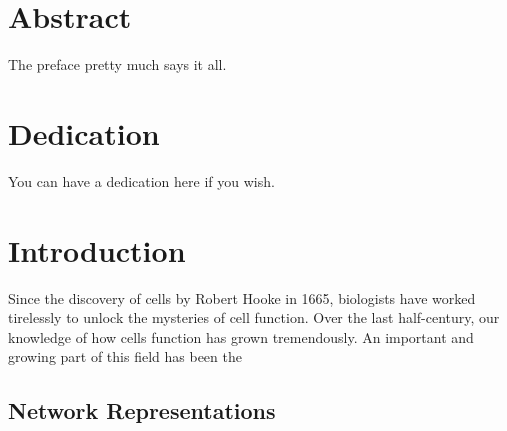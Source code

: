 \documentclass[12pt,twoside]{reedthesis}
\theoremstyle{definition}
\begin{document}
\vfill\vfill


    \tableofcontents
    \listoftables
    \listoffigures

    \chapter*{Abstract}
	The preface pretty much says it all.

	\chapter*{Dedication}
	You can have a dedication here if you wish.

  \mainmatter %
  \pagestyle{fancyplain} %


    \chapter*{Introduction}

\onehalfspacing

Since the discovery of cells by Robert Hooke in 1665, biologists have worked tirelessly to unlock the mysteries of cell function. Over the last half-century, our knowledge of how cells function has grown tremendously. An important and growing part of this field has been the

 \section{Network Representations}
\end{document}
